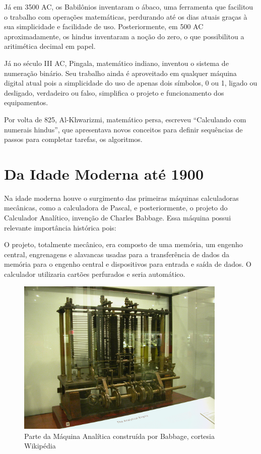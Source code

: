\documentclass[brazil,times]{abnt}
\begin{document}
Já em 3500 AC, os Babilônios inventaram o ábaco, uma ferramenta que facilitou o
trabalho com operações matemáticas, perdurando até os dias atuais graças à sua
simplicidade e facilidade de uso. Posteriormente, em 500 AC aproximadamente, os
hindus inventaram a noção do zero, o que possibilitou a
aritimética decimal em papel.

Já no século III AC, Pingala, matemático indiano, inventou o sistema de
numeração binário. Seu trabalho ainda é aproveitado em qualquer máquina digital
atual pois a simplicidade do uso de apenas dois símbolos, 0 ou 1, ligado ou
desligado, verdadeiro ou falso, simplifica o projeto e funcionamento dos
equipamentos.

Por volta de 825, Al-Khwarizmi, matemático persa, escreveu ``Calculando com
numerais hindus'', que apresentava novos conceitos para definir
sequências de passos para completar tarefas, os algoritmos.

\section{Da Idade Moderna até 1900}
Na idade moderna houve o surgimento das primeiras máquinas calculadoras
mecânicas, como a calculadora de Pascal, e posteriormente, o projeto do
Calculador Analítico, invenção de Charles Babbage. Essa máquina possui relevante
importância histórica pois:

\begin{citacao}
O projeto, totalmente mecânico, era composto de uma memória, um engenho central,
engrenagens e alavancas usadas para a transferência de dados da memória para o
engenho central e dispositivos para entrada e saída de dados. O calculador
utilizaria cartões perfurados e seria automático.

\cite{babbage-e-ada}
\end{citacao}

\begin{figure}[htp]
\begin{center}
  \includegraphics[width=100mm]{imagens/AnalyticalMachine_Babbage_London.jpg}
  \caption[Parte da Máquina Analítica construída por Babbage, cortesia
  Wikipédia]{Parte da Máquina Analítica construída por Babbage, cortesia
  Wikipédia}
  \label{fig:maquina-analitica}
\end{center}
\end{figure}
\end{document}
